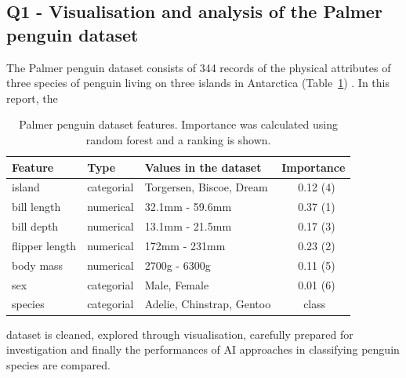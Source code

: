 \documentclass[a4paper, 11pt]{article}
\begin{document}
\begin{center}
  \subsection*{Q1 - Visualisation and analysis of the Palmer penguin dataset}
\end{center}

\noindent
The Palmer penguin dataset consists of 344 records of the physical attributes of three species of penguin 
living on three islands in Antarctica (Table~\ref{tab:dataset}) \cite{PM}. In this
report, the
\begin{table} %
  \small
  \begin{center}
  \vspace{-1.7\baselineskip} %
  \setlength{\abovecaptionskip}{5pt}
  \setlength{\belowcaptionskip}{5pt}
  \fontsize{10}{10}\selectfont %
  \begin{tabular}{l|l|l|l}
  \textbf{Feature}&\textbf{Type}&\textbf{Values in the dataset}&\textbf{Importance}\\
  \hline
  island&categorial&Torgersen, Biscoe, Dream&\ \ \ 0.12 (4)\\
  bill length&numerical&32.1mm - 59.6mm&\ \ \ 0.37 (1)\\
  bill depth&numerical&13.1mm - 21.5mm&\ \ \ 0.17 (3)\\
  flipper length&numerical&172mm - 231mm&\ \ \ 0.23 (2)\\
  body mass&numerical&2700g - 6300g&\ \ \ 0.11 (5)\\
  sex&categorial&Male, Female&\ \ \ 0.01 (6)\\
  species&categorial&Adelie, Chinstrap, Gentoo&\ \ \ \ class\\
  \end{tabular}
  \vspace{-2\baselineskip} %
  \end{center} 
  \caption{\centering\linespread{0.8}\selectfont Palmer penguin dataset features. Importance was calculated using random forest and a ranking is shown.}
  \vspace{-2\baselineskip} %
  \label{tab:dataset}
\end{table}
dataset is cleaned, explored through visualisation,  carefully prepared
for investigation and finally the performances of AI approaches in classifying penguin species are compared.
\end{document}

